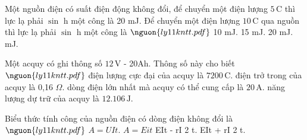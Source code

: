 \begin{ex}
Một nguồn điện có suất điện động không đổi, để chuyển một điện lượng $5\,\mathrm{C}$ thì lực lạ phải $\sin$ h một công là 20 mJ. Để chuyển một điện lượng $10\,\mathrm{C}$ qua nguồn thì lực lạ phải $\sin$ h một công là $\nguon{ly11 kntt.pdf}$
\choice
{10 mJ.}
{15 mJ.}
{20 mJ.}
{ mJ.}
\end{ex}

\begin{ex}
Một acquy có ghi thông số $12\,\mathrm{V}$ - 20Ah. Thông số này cho biết $\nguon{ly11 kntt.pdf}$
\choice
{điện lượng cực đại của acquy là $7200\,\mathrm{C}$.}
{điện trở trong của acquy là 0,16 $\Omega$.}
{\True dòng điện lớn nhất mà acquy có thể cung cấp là $20\,\mathrm{A}$.}
{năng lượng dự trữ của acquy là $12.106\,\mathrm{J}$.}
\end{ex}

\begin{ex}
Biểu thức tính công của nguồn điện có dòng điện không đổi là $\nguon{ly11 kntt.pdf}$
\choice
{$A = UIt$.}
{\True $A = Eit$}
{EIt - rI 2 t.}
{EIt + rI 2 t.}
\end{ex}
